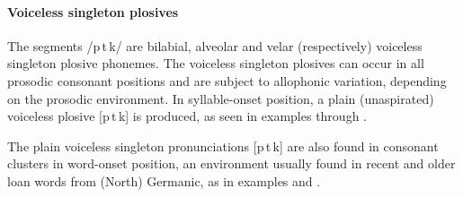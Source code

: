 \paragraph{Voiceless singleton plosives}\label{ptk}
The segments /p\,t\,k/ are bilabial, alveolar and velar (respectively) voiceless singleton plosive phonemes. %
The voiceless singleton plosives can occur in all prosodic consonant positions and are subject to allophonic variation, depending on the prosodic environment. In syllable-onset position, a plain (unaspirated) voiceless plosive [p\,t\,k] is produced, as seen in examples  through . %

The plain voiceless singleton pronunciations [p\,t\,k] %
are also found in consonant clusters in word-onset position, an environment usually found in recent and older loan words from (North) Germanic, as in examples  %
and . %
\clearpage
\vspace{-1em}

